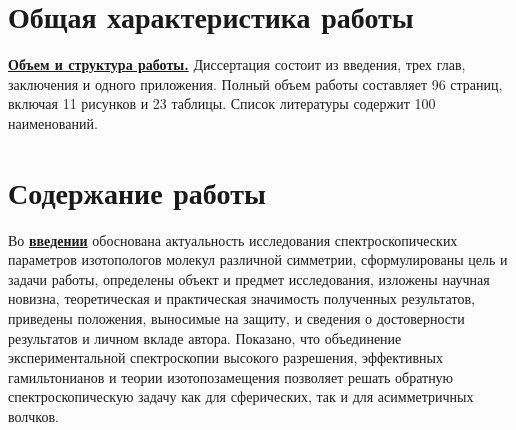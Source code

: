 \section*{Общая характеристика работы}

\newcommand{\actuality}{\pdfbookmark[1]{Актуальность}{actuality}}%
\newcommand{\progress}{\pdfbookmark[1]{Разработанность темы}{progress}\underline{\textbf{\progressTXT}}}
\newcommand{\aim}{\pdfbookmark[1]{Цели}{aim}\underline{{\textbf\aimTXT}}}
\newcommand{\tasks}{\pdfbookmark[1]{Задачи}{tasks}\underline{\textbf{\tasksTXT}}}
\newcommand{\aimtasks}{\pdfbookmark[1]{Цели и задачи}{aimtasks}\aimtasksTXT}
\newcommand{\novelty}{\pdfbookmark[1]{Научная новизна}{novelty}\underline{\textbf{\noveltyTXT}}}
\newcommand{\influence}{\pdfbookmark[1]{Практическая значимость}{influence}\underline{\textbf{\influenceTXT}}}
\newcommand{\methods}{\pdfbookmark[1]{Методология и методы исследования}{methods}\underline{\textbf{\methodsTXT}}}
\newcommand{\defpositions}{\pdfbookmark[1]{Положения, выносимые на защиту}{defpositions}\underline{\textbf{\defpositionsTXT}}}
\newcommand{\reliability}{\pdfbookmark[1]{Достоверность}{reliability}\underline{\textbf{\reliabilityTXT}}}
\newcommand{\probation}{\pdfbookmark[1]{Апробация}{probation}\underline{\textbf{\probationTXT}}}
\newcommand{\contribution}{\pdfbookmark[1]{Личный вклад}{contribution}\underline{\textbf{\contributionTXT}}}
\newcommand{\publications}{\pdfbookmark[1]{Публикации}{publications}\underline{\textbf{\publicationsTXT}}}


\underline{\textbf{Объем и структура работы.}} Диссертация состоит из введения, трех глав,
заключения и одного приложения. Полный объем работы составляет 96 страниц, включая 11 рисунков и
23 таблицы. Список литературы содержит 100 наименований.

\section*{Содержание работы}

Во \underline{\textbf{введении}} обоснована актуальность исследования спектроскопических параметров
изотопологов молекул различной симметрии, сформулированы цель и задачи работы, определены объект и
предмет исследования, изложены научная новизна, теоретическая и практическая значимость полученных
результатов, приведены положения, выносимые на защиту, и сведения о достоверности результатов и
личном вкладе автора. Показано, что объединение экспериментальной спектроскопии высокого разрешения,
эффективных гамильтонианов и теории изотопозамещения позволяет решать обратную спектроскопическую
задачу как для сферических, так и для асимметричных волчков.

